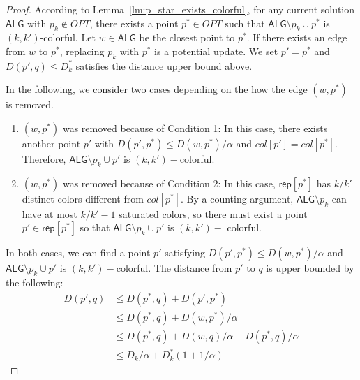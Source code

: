 \begin{proof}
According to Lemma~\ref{lm:p_star_exists_colorful}, for any current solution $\mathsf{ALG}$ with $p_k\notin OPT$, there exists a point $p^* \in OPT$ such that $\mathsf{ALG}\setminus p_k\cup p^*$ is $(k,k')$-colorful. Let $w\in \mathsf{ALG}$ be the closest point to $p^*$. If there exists an edge from $w$ to $p^*$, replacing $p_k$ with $p^*$ is a potential update. We set $p'=p^*$ and $D(p',q)\le D^*_k$ satisfies the distance upper bound above.


In the following, we consider two cases depending on the how the edge  $(w,p^*)$ is removed.

\begin{enumerate}
    \item $(w,p^*)$ was removed because of Condition 1: In this case, there exists another point $p'$ with $D(p',p^*)\le D(w,p^*)/\alpha$ and $col[p']=col[p^*]$. Therefore, $\mathsf{ALG}\setminus p_k\cup p'$ is $(k,k')-$colorful.
    \item $(w,p^*)$ was removed because of Condition 2: In this case, $\mathsf{rep}[p^*]$ has $k/k'$ distinct colors different from $col[p^*]$. By a counting argument, $\mathsf{ALG}\setminus p_k$ can have at most $k/k'-1$ saturated colors, so there must exist a point $p'\in \mathsf{rep}[p^*]$ so that $\mathsf{ALG}\setminus p_k\cup p'$ is $(k,k')-$ colorful.
\end{enumerate}

In both cases, we can find a point $p'$ satisfying $D(p',p^*)\le D(w,p^*)/\alpha$ and $\mathsf{ALG}\setminus p_k\cup p'$ is $(k,k')-$colorful. The distance from $p'$ to $q$ is upper bounded by the following:
\begin{align}
D(p',q)&\le D(p^*,q)+D(p',p^*) \\
&\le D(p^*,q)+D(w,p^*)/\alpha \\
&\le D(p^*,q)+D(w,q)/\alpha+D(p^*,q)/\alpha \\
&\le D_k/\alpha+D^*_k(1+1/\alpha)
\end{align}

\end{proof}

